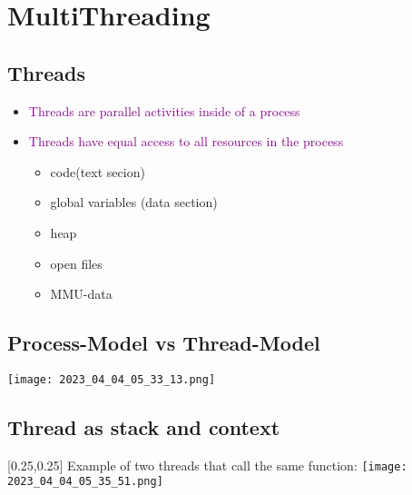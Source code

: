 \documentclass[main.tex,fontsize=8pt,paper=a4,paper=portrait,DIV=calc,]{scrartcl}
\begin{document}
\section{MultiThreading}

\subsection{Threads}
\begin{itemize}
\item \textcolor{purple}{Threads are parallel activities inside of a process}
\item \textcolor{purple}{Threads have equal access to all resources in the process}\newline
  \begin{itemize}
  \item code(text secion) 
  \item global variables (data section)
  \item heap
  \item open files
  \item MMU-data
  \end{itemize} 
\end{itemize} 

\subsection{Process-Model vs Thread-Model}
\texttt{[image: 2023\_04\_04\_05\_33\_13.png]}

\subsection{Thread as stack and context}
[0.25,0.25]
Example of two threads that call the same function:\newline
\texttt{[image: 2023\_04\_04\_05\_35\_51.png]}
\end{document}
